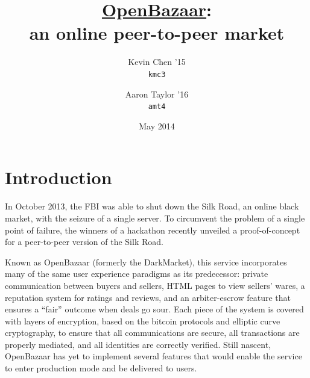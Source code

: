 \documentclass[11pt,twocolumn]{article}
\title{\bf \sc \href{https://github.com/OpenBazaar/OpenBazaar}{OpenBazaar}: \\ an online peer-to-peer market}
\author{
    {\rm Kevin Chen '15} \\
    {\tt kmc3}
    \and 
    {\rm Aaron Taylor '16} \\
    {\tt amt4}
}
\date{May 2014}
\begin{document}
\maketitle

\doublespacing

\newcommand{\kbucket}{}
\def\kbucket/{{$k$-bucket}}

\newcommand{\OpenBazaar}{}
\def\OpenBazaar/{{\sc OpenBazaar}}

\newcommand{\Kademlia}{}
\def\Kademlia/{{\sc Kademlia}}

\newcommand{\Entangled}{}
\def\Entangled/{{\sc Entangled}}

\newcommand{\Twisted}{}
\def\Twisted/{{\sc Twisted}}

\newcommand{\Tornado}{}
\def\Tornado/{{\sc Tornado}}

\newcommand{\reactor}{}
\def\reactor/{{\sc reactor}}

\newcommand{\ZMQ}{}
\def\ZMQ/{\O{}MQ}

\newcommand{\kv}{}
\def\kv/{$\langle$key,value$\rangle$}

\newcommand{\findNode}{}
\def\findNode/{{\sc find\_node}}

\newcommand{\findValue}{}
\def\findValue/{{\sc find\_value}}

\newcommand{\ping}{}
\def\ping/{{\sc ping}}

\newcommand{\store}{}
\def\store/{{\sc store}}

\newcommand{\delete}{}
\def\delete/{{\sc delete}}






\section{Introduction}
In October 2013, the FBI was able to shut down the Silk Road, an online black market, with the seizure of a single server.
To circumvent the problem of a single point of failure, the winners of a hackathon recently unveiled a proof-of-concept for a peer-to-peer version of the Silk Road.

Known as \OpenBazaar/ (formerly the DarkMarket), this service incorporates many of the same user experience paradigms as its predecessor: private communication between buyers and sellers, HTML pages to view sellers' wares, a reputation system for ratings and reviews, and an arbiter-escrow feature that ensures a ``fair'' outcome when deals go sour.
Each piece of the system is covered with layers of encryption, based on the bitcoin protocols and elliptic curve cryptography, to ensure that all communications are secure, all transactions are properly mediated, and all identities are correctly verified.
Still nascent, \OpenBazaar/ has yet to implement several features that would enable the service to enter production mode and be delivered to users.
\end{document}
